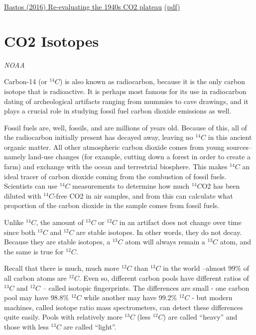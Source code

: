 \documentclass[
]{book}
\begin{document}
\href{https://bg.copernicus.org/articles/13/4877/2016/}{Bastos (2016) Re-evaluating the 1940s CO2 plateau}
\href{pdf/Bastos_2016_Revealutaing_1940s_CO2_plateau.pdf}{(pdf)}

\hypertarget{co2-isotopes}{%
\chapter{CO2 Isotopes}\label{co2-isotopes}}

\emph{NOAA}

Carbon-14 (or \({}^{14}C\)) is also known as radiocarbon, because it is the only carbon isotope that is radioactive. It is perhaps most famous for its use in radiocarbon dating of archeological artifacts ranging from mummies to cave drawings, and it plays a crucial role in studying fossil fuel carbon dioxide emissions as well.

Fossil fuels are, well, fossils, and are millions of years old. Because of this, all of the radiocarbon initially present has decayed away, leaving no \({}^{14}C\) in this ancient organic matter. All other atmospheric carbon dioxide comes from young sources--namely land-use changes (for example, cutting down a forest in order to create a farm) and exchange with the ocean and terrestrial biosphere. This makes \({}^{14}C\) an ideal tracer of carbon dioxide coming from the combustion of fossil fuels. Scientists can use \({}^{14}C\) measurements to determine how much \({}^{14}C\)O2 has been diluted with \({}^{14}C\)-free CO2 in air samples, and from this can calculate what proportion of the carbon dioxide in the sample comes from fossil fuels.

Unlike \({}^{14}C\), the amount of \({}^{13}C\) or \({}^{12}C\) in an artifact does not change over time since both \({}^{13}C\) and \({}^{12}C\) are stable isotopes. In other words, they do not decay. Because they are stable isotopes, a \({}^{13}C\) atom will always remain a \({}^{13}C\) atom, and the same is true for \({}^{12}C\).

Recall that there is much, much more \({}^{12}C\) than \({}^{13}C\) in the world --almost 99\% of all carbon atoms are \({}^{12}C\). Even so, different carbon pools have different ratios of \({}^{13}C\) and \({}^{12}C\) -- called isotopic fingerprints. The differences are small - one carbon pool may have 98.8\% \({}^{12}C\) while another may have 99.2\% \({}^{12}C\) - but modern machines, called isotope ratio mass spectrometers, can detect these differences quite easily. Pools with relatively more \({}^{13}C\) (less \({}^{12}C\)) are called ``heavy'' and those with less \({}^{13}C\) are called ``light''.
\end{document}
